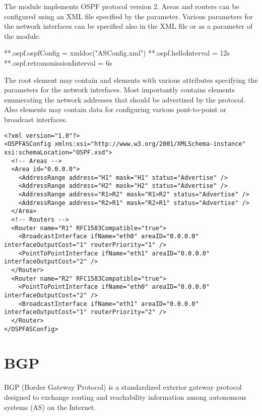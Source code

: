 The  module implements OSPF protocol version 2. Areas and routers
can be configured using an XML file specified by the  parameter.
Various parameters for the network interfaces can be specified also in the XML
file or as a parameter of the  module.

\begin{inifile}
  **.ospf.ospfConfig = xmldoc("ASConfig.xml")
  **.ospf.helloInterval = 12s
  **.ospf.retransmissionInterval = 6s
\end{inifile}

The  root element may contain  and 
elements with various attributes specifying the parameters for the network
interfaces. Most importantly  contains  elements
enumerating the network addresses that should be advertized by the protocol.
Also  elements may contain data for configuring various pont-to-point
or broadcast interfaces.

\begin{verbatim}
<?xml version="1.0"?>
<OSPFASConfig xmlns:xsi="http://www.w3.org/2001/XMLSchema-instance" xsi:schemaLocation="OSPF.xsd">
  <!-- Areas -->
  <Area id="0.0.0.0">
    <AddressRange address="H1" mask="H1" status="Advertise" />
    <AddressRange address="H2" mask="H2" status="Advertise" />
    <AddressRange address="R1>R2" mask="R1>R2" status="Advertise" />
    <AddressRange address="R2>R1" mask="R2>R1" status="Advertise" />
  </Area>
  <!-- Routers -->
  <Router name="R1" RFC1583Compatible="true">
    <BroadcastInterface ifName="eth0" areaID="0.0.0.0" interfaceOutputCost="1" routerPriority="1" />
    <PointToPointInterface ifName="eth1" areaID="0.0.0.0" interfaceOutputCost="2" />
  </Router>
  <Router name="R2" RFC1583Compatible="true">
    <PointToPointInterface ifName="eth0" areaID="0.0.0.0" interfaceOutputCost="2" />
    <BroadcastInterface ifName="eth1" areaID="0.0.0.0" interfaceOutputCost="1" routerPriority="2" />
  </Router>
</OSPFASConfig>
\end{verbatim}

\section{BGP}
\label{sec:bgp}

BGP (Border Gateway Protocol) is a standardized exterior gateway protocol
designed to exchange routing and reachability information among
autonomous systems (AS) on the Internet.

